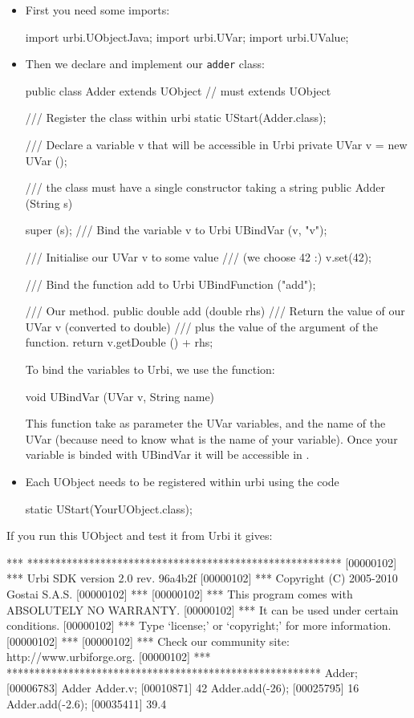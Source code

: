 \begin{itemize}
\item First you need some imports:

\begin{cxx}
import urbi.UObjectJava;
import urbi.UVar;
import urbi.UValue;
\end{cxx}

\item Then we declare and implement our \lstinline{adder} class:
\begin{cxx}
public class Adder extends UObject // must extends UObject
{
    /// Register the class within urbi
    static { UStart(Adder.class); }

    /// Declare a variable v that will be accessible in Urbi
    private UVar v = new UVar ();

    /// the class must have a single constructor taking a string
    public Adder (String s) {

    	super (s);
    	/// Bind the variable v to Urbi
    	UBindVar (v, "v");

    	/// Initialise our UVar v to some value
    	/// (we choose 42 :)
    	v.set(42);

    	/// Bind the function add to Urbi
    	UBindFunction ("add");
    }

    /// Our method.
    public double add (double rhs) {
    	/// Return the value of our UVar v (converted to double)
    	/// plus the value of the argument of the function.
    	return v.getDouble () + rhs;
    }
}
\end{cxx}

To bind the variables to Urbi, we use the function:
\begin{cxx}
void UBindVar (UVar v, String name)
\end{cxx}

This function take as parameter the UVar variables, and the name of the
UVar (because \urbi need to know what is the name of your variable).
Once your variable is binded with UBindVar it will be accessible in \urbi.

\item Each UObject needs to be registered within urbi using the code
\begin{cxx}
static { UStart(YourUObject.class); }
\end{cxx}
\end{itemize}

If you run this UObject and test it from Urbi it gives:

\begin{cxx}
[00000102] *** ********************************************************
[00000102] *** Urbi SDK version 2.0 rev. 96a4b2f
[00000102] *** Copyright (C) 2005-2010 Gostai S.A.S.
[00000102] ***
[00000102] *** This program comes with ABSOLUTELY NO WARRANTY.
[00000102] *** It can be used under certain conditions.
[00000102] *** Type `license;' or `copyright;' for more information.
[00000102] ***
[00000102] *** Check our community site: http://www.urbiforge.org.
[00000102] *** ********************************************************
Adder;
[00006783] Adder
Adder.v;
[00010871] 42
Adder.add(-26);
[00025795] 16
Adder.add(-2.6);
[00035411] 39.4
\end{cxx}

